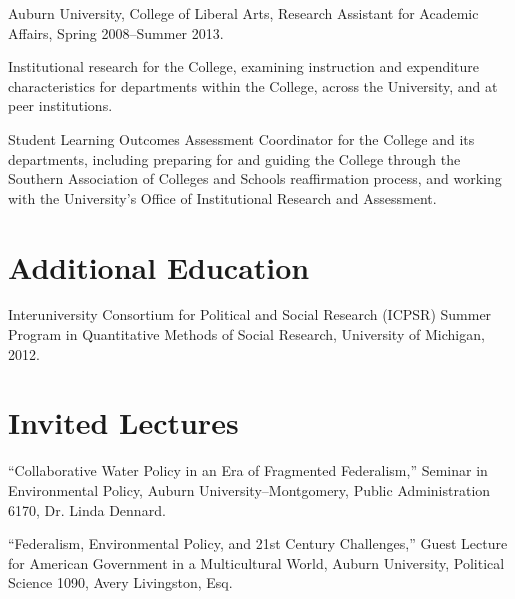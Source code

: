 \documentclass[11pt,letterpaper]{article}
\renewenvironment{itemize}{
  \begin{list}{}{
    \setlength{\leftmargin}{1.5em}
    \setlength{\itemsep}{0.25em}
    \setlength{\parskip}{0pt}
    \setlength{\parsep}{0.25em}
  }
}{
  \end{list}
}
\begin{document}
\begin{itemize}
\item Auburn University, College of Liberal Arts, Research Assistant for Academic Affairs,
  Spring 2008--Summer 2013.
  	\begin{itemize}\leftmargin=2pt\itemindent=-15pt
		\item Institutional research for the College, examining instruction and expenditure characteristics for departments within the College, across the University, and at peer institutions.   
		\item Student Learning Outcomes Assessment Coordinator for the College and its departments, including preparing for and guiding the College through the Southern Association of Colleges and Schools reaffirmation process, and working with the University's Office of Institutional Research and Assessment.
	\end{itemize}
\end{itemize}
		

\section*{Additional Education}
\begin{itemize}
\item Interuniversity Consortium for Political and Social Research (ICPSR) Summer Program in Quantitative Methods of Social Research, University of Michigan, 2012. 
\end{itemize}

\section*{Invited Lectures}
\begin{itemize}\leftmargin=2pt\itemindent=-15pt
	\item ``Collaborative Water Policy in an Era of Fragmented Federalism,'' Seminar in Environmental Policy, Auburn University--Montgomery, Public Administration 6170, Dr. Linda Dennard.
	
	\item ``Federalism, Environmental Policy, and 21st Century Challenges,'' Guest Lecture for American Government in a Multicultural World, Auburn University, Political Science 1090, Avery Livingston, Esq. 
	
\end{itemize}
\end{document}
